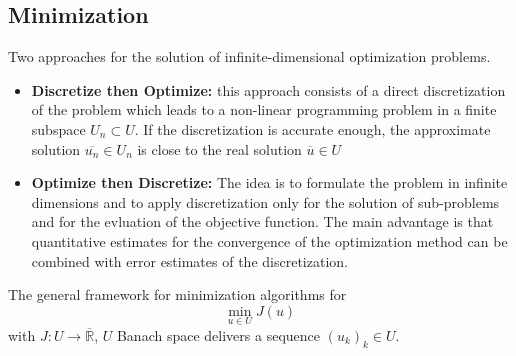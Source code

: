 \subsection{Minimization}
Two approaches for the solution of infinite-dimensional optimization problems.

\begin{itemize}
	\item \textbf{Discretize then Optimize:} this approach consists of a direct discretization of the problem which leads to a non-linear programming problem in a finite subspace $U_n \subset U$. If the discretization is accurate enough, the approximate solution $\overline{u_n} \in U_n$ is close to the real solution $\overline{u} \in U$
	
	\item \textbf{Optimize then Discretize:} The idea is to formulate the problem in infinite dimensions and to apply discretization only for the solution of sub-problems and for the evluation of the objective function. The main advantage is that quantitative estimates for the convergence of the optimization method can be combined with error estimates of the discretization.
\end{itemize}
The general framework for minimization algorithms for 
\[
	\min_{u\in U} J(u)
\]
with $J:U\rightarrow \overline{\mathbb{R}}$, $U$ Banach space delivers a sequence $(u_k)_k \in U$.

